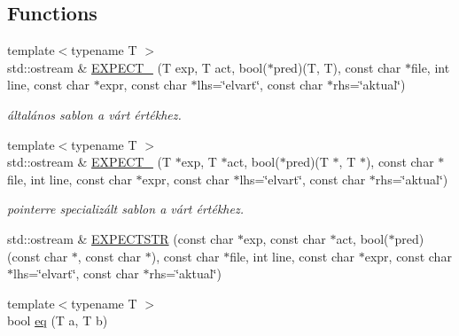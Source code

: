 \subsection*{Functions}
\begin{DoxyCompactItemize}
\item 
\mbox{\label{namespacegtest__lite_ab358c162e1cedfc39abf5959417ffc1e}} 
{\footnotesize template$<$typename T $>$ }\\std\+::ostream \& \hyperlink{namespacegtest__lite_ab358c162e1cedfc39abf5959417ffc1e}{E\+X\+P\+E\+C\+T\+\_\+} (T exp, T act, bool($\ast$pred)(T, T), const char $\ast$file, int line, const char $\ast$expr, const char $\ast$lhs=\char`\"{}elvart\char`\"{}, const char $\ast$rhs=\char`\"{}aktual\char`\"{})
\begin{DoxyCompactList}\small\item\em általános sablon a várt értékhez. \end{DoxyCompactList}\item 
\mbox{\label{namespacegtest__lite_a8b21cff4e93dcacdd1b4fdb8b6b9c740}} 
{\footnotesize template$<$typename T $>$ }\\std\+::ostream \& \hyperlink{namespacegtest__lite_a8b21cff4e93dcacdd1b4fdb8b6b9c740}{E\+X\+P\+E\+C\+T\+\_\+} (T $\ast$exp, T $\ast$act, bool($\ast$pred)(T $\ast$, T $\ast$), const char $\ast$file, int line, const char $\ast$expr, const char $\ast$lhs=\char`\"{}elvart\char`\"{}, const char $\ast$rhs=\char`\"{}aktual\char`\"{})
\begin{DoxyCompactList}\small\item\em pointerre specializált sablon a várt értékhez. \end{DoxyCompactList}\item 
std\+::ostream \& \hyperlink{namespacegtest__lite_aea477921e4c26d2a2806bc3011066270}{E\+X\+P\+E\+C\+T\+S\+TR} (const char $\ast$exp, const char $\ast$act, bool($\ast$pred)(const char $\ast$, const char $\ast$), const char $\ast$file, int line, const char $\ast$expr, const char $\ast$lhs=\char`\"{}elvart\char`\"{}, const char $\ast$rhs=\char`\"{}aktual\char`\"{})
\item 
{\footnotesize template$<$typename T $>$ }\\bool \hyperlink{namespacegtest__lite_aa7762f23094d59c699ec402e1a37640c}{eq} (T a, T b)
\item 
\mbox{\label{namespacegtest__lite_a34055f353dabbe4ed9063f1d36af6022}} 

\end{DoxyCompactItemize}
